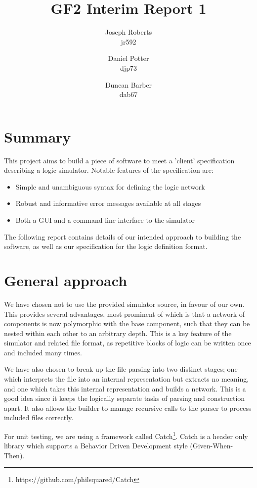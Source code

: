 \documentclass[a4paper]{article}
\author{Joseph Roberts \\
        \small{jr592}
        \and
        Daniel Potter\\
        \small{djp73}
        \and
        Duncan Barber \\
        \small{dab67}
       }
\title{GF2 Interim Report 1}
\begin{document}
\nocite{*}
\maketitle

\section{Summary}
    This project aims to build a piece of software to meet a 'client' specification describing a logic simulator. Notable features of the specification are:
    \begin{itemize}
        \item Simple and unambiguous syntax for defining the logic network
        \item Robust and informative error messages available at all stages
        \item Both a GUI and a command line interface to the simulator
    \end{itemize}

    The following report contains details of our intended approach to building the software, as well as our specification for the logic definition format.

\section{General approach}
\label{sec:general}
    We have chosen not to use the provided simulator source, in favour of our own. This provides several advantages, most prominent of which is that a network of components is now polymorphic with the base component, such that they can be nested within each other to an arbitrary depth. This is a key feature of the simulator and related file format, as repetitive blocks of logic can be written once and included many times.

    We have also chosen to break up the file parsing into two distinct stages; one which interprets the file into an internal representation but extracts no meaning, and one which takes this internal representation and builds a network. This is a good idea since it keeps the logically separate tasks of parsing and construction apart. It also allows the builder to manage recursive calls to the parser to process included files correctly.

    For unit testing, we are using a framework called Catch\footnote{https://github.com/philsquared/Catch}. Catch is a header only library which supports a Behavior Driven Development style (Given-When-Then).
\end{document}
